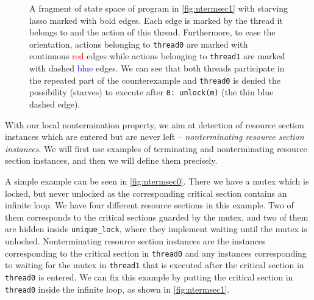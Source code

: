 \begin{figure}[tp]
\center
{}
\caption{
A fragment of state space of program in \autoref{fig:ntermsec1} with starving lasso marked with bold edges.
Each edge is marked by the thread it belongs to and the action of this thread.
Furthermore, to ease the orientation, actions belonging to \texttt{thread0} are marked with continuous \textcolor{red}{red} edges while actions belonging to \texttt{thread1} are marked with dashed \textcolor{blue}{blue} edges.
We can see that both threads participate in the repeated part of the counterexample and \texttt{thread0} is denied the possibility (starves) to execute after \texttt{0:~unlock(m)} (the thin blue dashed edge).
} \label{fig:ntermsec1ce}
\end{figure}

With our local nontermination property, we aim at detection of resource section instances which are entered but are never left -- \emph{nonterminating resource section instances}.
We will first use examples of terminating and nonterminating resource section instances, and then we will define them precisely.

A simple example can be seen in \autoref{fig:ntermsec0}. There we have a mutex which
is locked, but never unlocked as the corresponding critical section contains an
infinite loop. We have four different resource sections in this example. Two
of them corresponds to the critical sections guarded by the mutex, and two of
them are hidden inside  \texttt{unique\_lock}, where they implement
waiting until the mutex is unlocked.
 Nonterminating resource section instances are the instances corresponding to the critical
section in \texttt{thread0} and any instances corresponding to waiting for the mutex
in \texttt{thread1} that is executed after the critical section in
\texttt{thread0} is entered.  We can fix this example by putting the critical
section in \texttt{thread0} inside the infinite loop, as shown in \autoref{fig:ntermsec1}.

